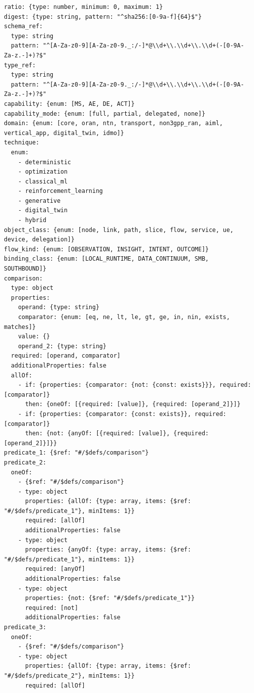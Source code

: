 \begin{verbatim}
ratio: {type: number, minimum: 0, maximum: 1}
digest: {type: string, pattern: "^sha256:[0-9a-f]{64}$"}
schema_ref:
  type: string
  pattern: "^[A-Za-z0-9][A-Za-z0-9._:/-]*@\\d+\\.\\d+\\.\\d+(-[0-9A-Za-z.-]+)?$"
type_ref:
  type: string
  pattern: "^[A-Za-z0-9][A-Za-z0-9._:/-]*@\\d+\\.\\d+\\.\\d+(-[0-9A-Za-z.-]+)?$"
capability: {enum: [MS, AE, DE, ACT]}
capability_mode: {enum: [full, partial, delegated, none]}
domain: {enum: [core, oran, ntn, transport, non3gpp_ran, aiml, vertical_app, digital_twin, idmo]}
technique:
  enum:
    - deterministic
    - optimization
    - classical_ml
    - reinforcement_learning
    - generative
    - digital_twin
    - hybrid
object_class: {enum: [node, link, path, slice, flow, service, ue, device, delegation]}
flow_kind: {enum: [OBSERVATION, INSIGHT, INTENT, OUTCOME]}
binding_class: {enum: [LOCAL_RUNTIME, DATA_CONTINUUM, SMB, SOUTHBOUND]}
comparison:
  type: object
  properties:
    operand: {type: string}
    comparator: {enum: [eq, ne, lt, le, gt, ge, in, nin, exists, matches]}
    value: {}
    operand_2: {type: string}
  required: [operand, comparator]
  additionalProperties: false
  allOf:
    - if: {properties: {comparator: {not: {const: exists}}}, required: [comparator]}
      then: {oneOf: [{required: [value]}, {required: [operand_2]}]}
    - if: {properties: {comparator: {const: exists}}, required: [comparator]}
      then: {not: {anyOf: [{required: [value]}, {required: [operand_2]}]}}
predicate_1: {$ref: "#/$defs/comparison"}
predicate_2:
  oneOf:
    - {$ref: "#/$defs/comparison"}
    - type: object
      properties: {allOf: {type: array, items: {$ref: "#/$defs/predicate_1"}, minItems: 1}}
      required: [allOf]
      additionalProperties: false
    - type: object
      properties: {anyOf: {type: array, items: {$ref: "#/$defs/predicate_1"}, minItems: 1}}
      required: [anyOf]
      additionalProperties: false
    - type: object
      properties: {not: {$ref: "#/$defs/predicate_1"}}
      required: [not]
      additionalProperties: false
predicate_3:
  oneOf:
    - {$ref: "#/$defs/comparison"}
    - type: object
      properties: {allOf: {type: array, items: {$ref: "#/$defs/predicate_2"}, minItems: 1}}
      required: [allOf]

\end{verbatim}
